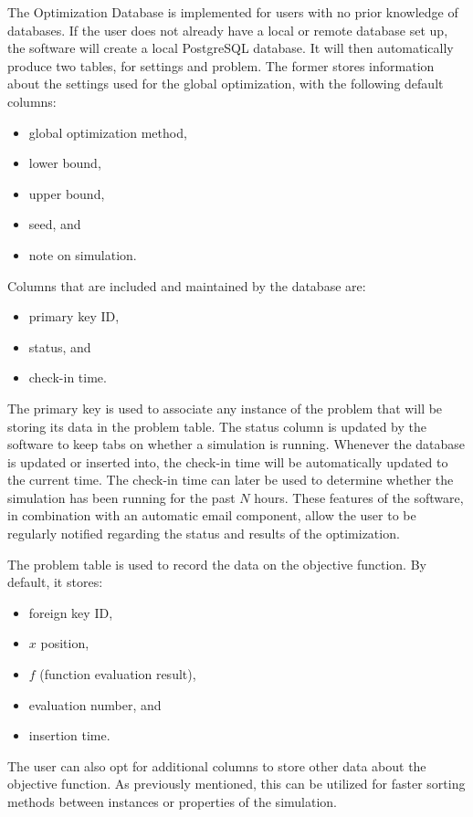 The Optimization Database is implemented for users with no prior knowledge of databases. If the user does not already have a local or remote database set up, the software will create a local PostgreSQL database. It will then automatically produce two tables, for settings and problem. The former  stores information about the settings used for the global optimization, with the following default columns:
\begin{itemize}
    \item global optimization method,
    \item lower bound,
    \item upper bound,
    \item seed, and
    \item note on simulation. 
\end{itemize}
Columns that are included and maintained by the database are:
\begin{itemize}
    \item primary key ID,
    \item status, and 
    \item check-in time. 
\end{itemize}
The primary key is used to associate any instance of the problem that will be storing its data in the problem table. The status column is updated by the software to keep tabs on whether a simulation is running. Whenever the database is updated or inserted into, the check-in time will be automatically updated to the current time. The check-in time can later be used to determine whether the simulation has been running for the past $N$ hours. These features of the software, in combination with an automatic email component, allow the user to be regularly notified regarding the status and results of the optimization. 


The problem table is used to record the data on the objective function. By default, it stores: 
\begin{itemize}
    \item foreign key ID,
    \item $x$ position,
    \item $f$ (function evaluation result),
    \item evaluation number, and
    \item insertion time.
\end{itemize}
The user can also opt for additional columns to store other data about the objective function. As previously mentioned, this can be utilized for faster sorting methods between instances or properties of the simulation. 

